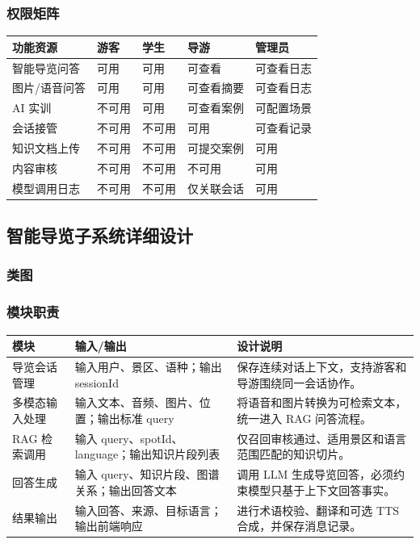 \subsubsection{权限矩阵}

\begin{longtable}{p{2.5cm}p{2.4cm}p{2.4cm}p{2.4cm}p{2.4cm}}
\toprule
功能资源 & 游客 & 学生 & 导游 & 管理员 \\
\midrule
智能导览问答 & 可用 & 可用 & 可查看 & 可查看日志 \\
图片/语音问答 & 可用 & 可用 & 可查看摘要 & 可查看日志 \\
AI 实训 & 不可用 & 可用 & 可查看案例 & 可配置场景 \\
会话接管 & 不可用 & 不可用 & 可用 & 可查看记录 \\
知识文档上传 & 不可用 & 不可用 & 可提交案例 & 可用 \\
内容审核 & 不可用 & 不可用 & 不可用 & 可用 \\
模型调用日志 & 不可用 & 不可用 & 仅关联会话 & 可用 \\
\bottomrule
\end{longtable}

\subsection{智能导览子系统详细设计}

\subsubsection{类图}

\newpage
\subsubsection{模块职责}

\begin{longtable}{p{3.2cm}p{4.2cm}p{5.8cm}}
\toprule
模块 & 输入/输出 & 设计说明 \\
\midrule
导览会话管理 & 输入用户、景区、语种；输出 sessionId & 保存连续对话上下文，支持游客和导游围绕同一会话协作。 \\
多模态输入处理 & 输入文本、音频、图片、位置；输出标准 query & 将语音和图片转换为可检索文本，统一进入 RAG 问答流程。 \\
RAG 检索调用 & 输入 query、spotId、language；输出知识片段列表 & 仅召回审核通过、适用景区和语言范围匹配的知识切片。 \\
回答生成 & 输入 query、知识片段、图谱关系；输出回答文本 & 调用 LLM 生成导览回答，必须约束模型只基于上下文回答事实。 \\
结果输出 & 输入回答、来源、目标语言；输出前端响应 & 进行术语校验、翻译和可选 TTS 合成，并保存消息记录。 \\
\bottomrule
\end{longtable}

